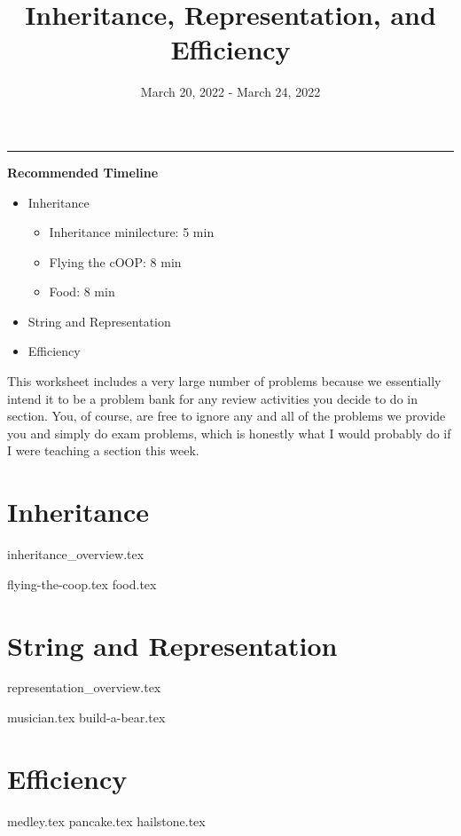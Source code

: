 \documentclass{exam}
\title{Inheritance, Representation, and Efficiency}
\date{March 20, 2022 - March 24, 2022}
\begin{document}
\maketitle
\rule{\textwidth}{0.15em}
\fontsize{12}{15}\selectfont

\begin{meta}
    \textbf{Recommended Timeline}
    \begin{itemize}
        \item Inheritance
        \begin{itemize}
            \item Inheritance minilecture: 5 min
            \item Flying the cOOP: 8 min
            \item Food: 8 min
        \end{itemize}
        \item String and Representation
        \item Efficiency
    \end{itemize}
    This worksheet includes a very large number of problems because we essentially intend it to be a problem bank for any review activities you decide to do in section. You, of course, are free to ignore any and all of the problems we provide you and simply do exam problems, which is honestly what I would probably do if I were teaching a section this week. 
\end{meta}

\section{Inheritance}
{inheritance_overview.tex}
\begin{questions}
    {flying-the-coop.tex}
    \newpage
    {food.tex}
    \newpage
\end{questions}

\section{String and Representation}
{representation_overview.tex}
\begin{questions}
    {musician.tex}
    {build-a-bear.tex}
\end{questions}

\section{Efficiency}
\begin{questions}
    {medley.tex}
    {pancake.tex}
    {hailstone.tex}
\end{questions}
\end{document}
